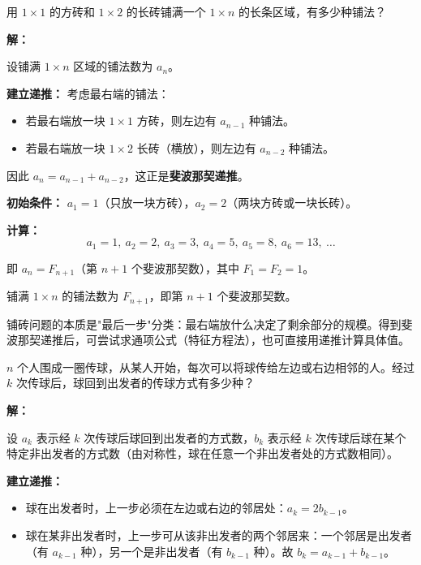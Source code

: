 \documentclass[12pt, a4paper]{ctexart}
\begin{document}
\vspace{6pt}

\begin{examplebox}
用 \(1\times 1\) 的方砖和 \(1\times 2\) 的长砖铺满一个 \(1\times n\) 的长条区域，有多少种铺法？
\end{examplebox}

\textbf{解：}

设铺满 \(1\times n\) 区域的铺法数为 \(a_n\)。

\textbf{建立递推：} 考虑最右端的铺法：
\begin{itemize}[leftmargin=1.5em]
  \item 若最右端放一块 \(1\times 1\) 方砖，则左边有 \(a_{n-1}\) 种铺法。
  \item 若最右端放一块 \(1\times 2\) 长砖（横放），则左边有 \(a_{n-2}\) 种铺法。
\end{itemize}

因此 \(a_n = a_{n-1} + a_{n-2}\)，这正是\textbf{斐波那契递推}。

\textbf{初始条件：} \(a_1 = 1\)（只放一块方砖），\(a_2 = 2\)（两块方砖或一块长砖）。

\textbf{计算：}
\[
a_1=1,\ a_2=2,\ a_3=3,\ a_4=5,\ a_5=8,\ a_6=13,\ \ldots
\]

即 \(a_n = F_{n+1}\)（第 \(n+1\) 个斐波那契数），其中 \(F_1=F_2=1\)。

铺满 \(1\times n\) 的铺法数为 \(\boxed{F_{n+1}}\)，即第 \(n+1\) 个斐波那契数。

\begin{tipbox}[方法总结]
铺砖问题的本质是"最后一步"分类：最右端放什么决定了剩余部分的规模。得到斐波那契递推后，可尝试求通项公式（特征方程法），也可直接用递推计算具体值。
\end{tipbox}

\vspace{6pt}

\begin{examplebox}
\(n\) 个人围成一圈传球，从某人开始，每次可以将球传给左边或右边相邻的人。经过 \(k\) 次传球后，球回到出发者的传球方式有多少种？
\end{examplebox}

\textbf{解：}

设 \(a_k\) 表示经 \(k\) 次传球后球回到出发者的方式数，\(b_k\) 表示经 \(k\) 次传球后球在某个特定非出发者的方式数（由对称性，球在任意一个非出发者处的方式数相同）。

\textbf{建立递推：}
\begin{itemize}[leftmargin=1.5em]
  \item 球在出发者时，上一步必须在左边或右边的邻居处：\(a_k = 2b_{k-1}\)。
  \item 球在某非出发者时，上一步可从该非出发者的两个邻居来：一个邻居是出发者（有 \(a_{k-1}\) 种），另一个是非出发者（有 \(b_{k-1}\) 种）。故 \(b_k = a_{k-1} + b_{k-1}\)。
\end{itemize}
\end{document}
